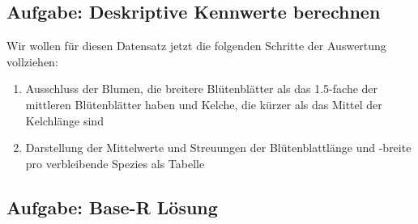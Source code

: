 \documentclass[
]{book}
\begin{document}
\hypertarget{aufgabe-deskriptive-kennwerte-berechnen}{%
\subsection{Aufgabe: Deskriptive Kennwerte berechnen}\label{aufgabe-deskriptive-kennwerte-berechnen}}

Wir wollen für diesen Datensatz jetzt die folgenden Schritte der Auswertung vollziehen:

\begin{enumerate}
\def\labelenumi{\arabic{enumi}.}
\item
  Ausschluss der Blumen, die breitere Blütenblätter als das 1.5-fache der mittleren Blütenblätter haben und Kelche, die kürzer als das Mittel der Kelchlänge sind
\item
  Darstellung der Mittelwerte und Streuungen der Blütenblattlänge und -breite pro verbleibende Spezies als Tabelle
\end{enumerate}

\hypertarget{aufgabe-base-r-luxf6sung}{%
\subsection{Aufgabe: Base-R Lösung}\label{aufgabe-base-r-luxf6sung}}
\end{document}
